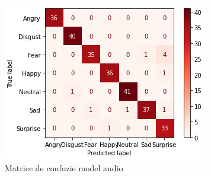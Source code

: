 \documentclass[a4paper, 12pt]{report}
\begin{document}
	\begin{figure}[H]
		\begin{center}
			\includegraphics[scale=0.4]{images/audio_confusion_matrix.png}
		\end{center}
		\caption{Matrice de confuzie model audio}
		\label{fig:audio_confusion_matrix}
	\end{figure}
	
	\clearpage
\end{document}
